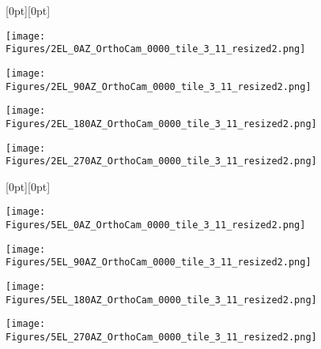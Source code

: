 \begin{figure}
    \centering
    \makebox[0.01\linewidth]{} %
    \vspace{0.1cm} %

    \begin{minipage}[b]{0.01\linewidth}
        \raisebox{2em}[0pt][0pt]{} %
    \end{minipage}
    \begin{minipage}[b]{0.19\linewidth}
        \centering
        \texttt{[image: Figures/2EL\_0AZ\_OrthoCam\_0000\_tile\_3\_11\_resized2.png]}
    \end{minipage}
    \begin{minipage}[b]{0.19\linewidth}
        \centering
        \texttt{[image: Figures/2EL\_90AZ\_OrthoCam\_0000\_tile\_3\_11\_resized2.png]}
    \end{minipage}
    \begin{minipage}[b]{0.19\linewidth}
        \centering
        \texttt{[image: Figures/2EL\_180AZ\_OrthoCam\_0000\_tile\_3\_11\_resized2.png]}
    \end{minipage}
    \begin{minipage}[b]{0.19\linewidth}
        \centering
        \texttt{[image: Figures/2EL\_270AZ\_OrthoCam\_0000\_tile\_3\_11\_resized2.png]}
    \end{minipage}

    \vspace{0.1cm} %

    \begin{minipage}[b]{0.01\linewidth}
        \raisebox{2em}[0pt][0pt]{} %
    \end{minipage}
    \begin{minipage}[b]{0.19\linewidth}
        \centering
        \texttt{[image: Figures/5EL\_0AZ\_OrthoCam\_0000\_tile\_3\_11\_resized2.png]}
    \end{minipage}
    \begin{minipage}[b]{0.19\linewidth}
        \centering
        \texttt{[image: Figures/5EL\_90AZ\_OrthoCam\_0000\_tile\_3\_11\_resized2.png]}
    \end{minipage}
    \begin{minipage}[b]{0.19\linewidth}
        \centering
        \texttt{[image: Figures/5EL\_180AZ\_OrthoCam\_0000\_tile\_3\_11\_resized2.png]}
    \end{minipage}
    \begin{minipage}[b]{0.19\linewidth}
        \centering
        \texttt{[image: Figures/5EL\_270AZ\_OrthoCam\_0000\_tile\_3\_11\_resized2.png]}
    \end{minipage}


\end{figure}
